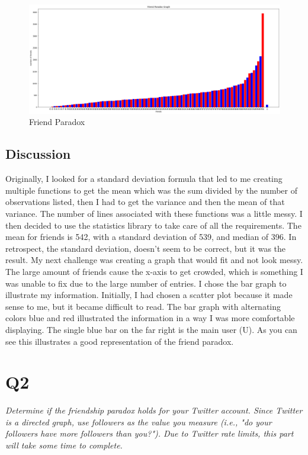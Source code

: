 \documentclass[12pt]{article}
\begin{document}
\begin{figure}
    \includegraphics[trim=0 20 10 50, clip, width=\textwidth] {friend-paradox-graph.png}
    \caption{Friend Paradox}
    \label{fig:friend}
\end{figure}
\subsection*{Discussion}

Originally, I looked for a standard deviation formula that led to me creating multiple functions to get the mean which was the sum divided by the number of observations listed, then I had to get the variance and then the mean of that variance. The number of lines associated with these functions was a little messy. I then decided to use the statistics library to take care of all the requirements. The mean for friends is 542, with a standard deviation of 539, and median of 396. In retrospect, the standard deviation, doesn't seem to be correct, but it was the result.  My next challenge was creating a graph that would fit and not look messy. The large amount of friends cause the x-axis to get crowded, which is something I was unable to fix due to the large number of entries. I chose the bar graph to illustrate my information. Initially, I had chosen a scatter plot because it made sense to me, but it became difficult to read. The bar graph with alternating colors blue and red illustrated the information in a way I was more comfortable displaying. The single blue bar on the far right is the main user (U). As you can see this illustrates a good representation of the friend paradox.

\section*{Q2}
\emph{Determine if the friendship paradox holds for your Twitter account. Since Twitter is a directed graph, use followers as the value you measure (i.e., "do your followers have more followers than you?"). Due to Twitter rate limits, this part will take some time to complete.}
\end{document}
